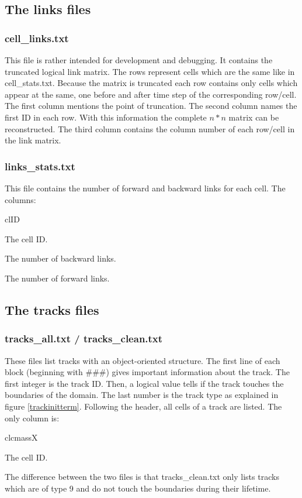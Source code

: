\documentclass{scrartcl}
\begin{document}
\subsection{The links files}
\subsubsection{cell\_links.txt}
This file is rather intended for development and debugging. It contains the truncated logical link matrix. The rows represent cells which are the same like in cell\_stats.txt. Because the matrix is truncated each row contains only cells which appear at the same, one before and after time step of the corresponding row/cell. The first column mentions the point of truncation. The second column names the first ID in each row. With this information the complete $n*n$ matrix can be reconstructed. The third column contains the column number of each row/cell in the link matrix.

\subsubsection{links\_stats.txt}
This file contains the number of forward and backward links for each cell. The columns:
\begin{labeling}{clID}
	\item[clID] The cell ID.
	\item[nbw] The number of backward links.
	\item[nfw] The number of forward links.

\end{labeling}

\subsection{The tracks files}
\subsubsection{tracks\_all.txt / tracks\_clean.txt}
These files list tracks with an object-oriented structure. The first line of each block (beginning with \#\#\#) gives important information about the track. The first integer is the track ID. Then, a logical value tells if the track touches the boundaries of the domain. The last number is the track type as explained in figure \ref{trackinitterm}. Following the header, all cells of a track are listed. The only column is:
\begin{labeling}{clcmassX}
	\item[clID] The cell ID.
\end{labeling}
The difference between the two files is that tracks\_clean.txt only lists tracks which are of type 9 and do not touch the boundaries during their lifetime. 
\end{document}
